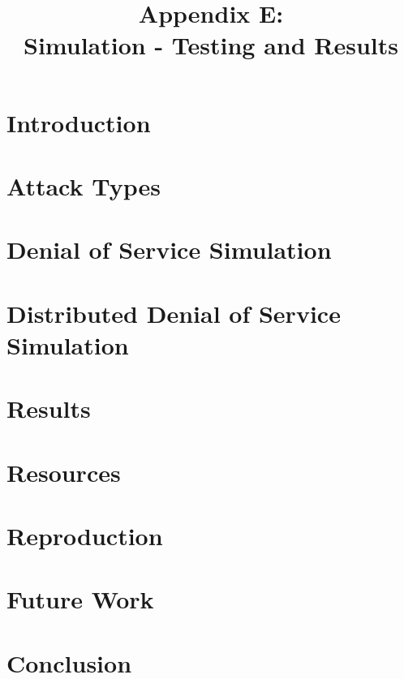 \documentclass[a4paper 12pt]{article}
\begin{document}
\setcounter{page}{1}
\renewcommand{\thepage}{E-\arabic{page}}
\title{Appendix E: \\
	\large Simulation - Testing and Results}
\date{}
\maketitle
\section{Introduction}

\section{Attack Types}

\section{Denial of Service Simulation}

\section{Distributed Denial of Service Simulation}

\section{Results}

\section{Resources}

\section{Reproduction}

\section{Future Work}

\section{Conclusion}

\clearpage
\printbibliography
\end{document}
